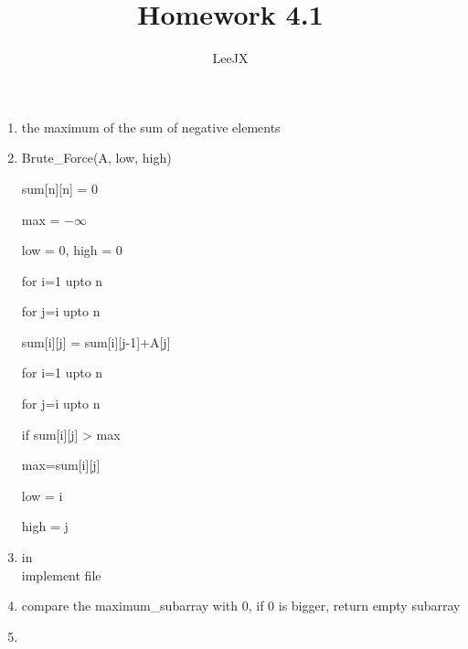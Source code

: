 \documentclass{article}
\title{Homework 4.1}
\author{LeeJX}
\begin{document}
\maketitle

\begin{enumerate}[\textbf{4.1}-1]
\item 
\par the maximum of the sum of negative elements
\item Brute\_Force(A, low, high)
\par sum[n][n] = 0
\par max = $-\infty$
\par low = 0, high = 0
\par for i=1 upto n
\par \quad for j=i upto n
\par \quad \quad sum[i][j] = sum[i][j-1]+A[j]
\par for i=1 upto n
\par \quad for j=i upto n
\par \quad \quad if sum[i][j] > max
\par \quad \quad \quad max=sum[i][j]
\par \quad \quad \quad low = i
\par \quad \quad \quad high = j
\item 
\par in \\implement file
\item
\par compare the maximum_subarray with 0, if 0 is bigger, return empty subarray
\item
\par 

\end{enumerate}
\end{document}
